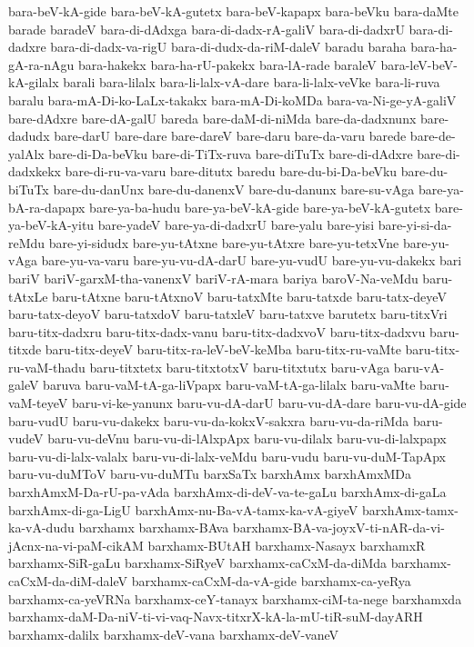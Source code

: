 {bara-beV-kA-gide
bara-beV-kA-gutetx
bara-beV-kapapx
bara-beVku
bara-daMte
barade
baradeV
bara-di-dAdxga
bara-di-dadx-rA-galiV
bara-di-dadxrU
bara-di-dadxre
bara-di-dadx-va-rigU
bara-di-dudx-da-riM-daleV
baradu
baraha
bara-ha-gA-ra-nAgu
bara-hakekx
bara-ha-rU-pakekx
bara-lA-rade
baraleV
bara-leV-beV-kA-gilalx
barali
bara-lilalx
bara-li-lalx-vA-dare
bara-li-lalx-veVke
bara-li-ruva
baralu
bara-mA-Di-ko-LaLx-takakx
bara-mA-Di-koMDa
bara-va-Ni-ge-yA-galiV
bare-dAdxre
bare-dA-galU
bareda
bare-daM-di-niMda
bare-da-dadxnunx
bare-dadudx
bare-darU
bare-dare
bare-dareV
bare-daru
bare-da-varu
barede
bare-de-yalAlx
bare-di-Da-beVku
bare-di-TiTx-ruva
bare-diTuTx
bare-di-dAdxre
bare-di-dadxkekx
bare-di-ru-va-varu
bare-ditutx
baredu
bare-du-bi-Da-beVku
bare-du-biTuTx
bare-du-danUnx
bare-du-danenxV
bare-du-danunx
bare-su-vAga
bare-ya-bA-ra-dapapx
bare-ya-ba-hudu
bare-ya-beV-kA-gide
bare-ya-beV-kA-gutetx
bare-ya-beV-kA-yitu
bare-yadeV
bare-ya-di-dadxrU
bare-yalu
bare-yisi
bare-yi-si-da-reMdu
bare-yi-sidudx
bare-yu-tAtxne
bare-yu-tAtxre
bare-yu-tetxVne
bare-yu-vAga
bare-yu-va-varu
bare-yu-vu-dA-darU
bare-yu-vudU
bare-yu-vu-dakekx
bari
bariV
bariV-garxM-tha-vanenxV
bariV-rA-mara
bariya
baroV-Na-veMdu
baru-tAtxLe
baru-tAtxne
baru-tAtxnoV
baru-tatxMte
baru-tatxde
baru-tatx-deyeV
baru-tatx-deyoV
baru-tatxdoV
baru-tatxleV
baru-tatxve
barutetx
baru-titxVri
baru-titx-dadxru
baru-titx-dadx-vanu
baru-titx-dadxvoV
baru-titx-dadxvu
baru-titxde
baru-titx-deyeV
baru-titx-ra-leV-beV-keMba
baru-titx-ru-vaMte
baru-titx-ru-vaM-thadu
baru-titxtetx
baru-titxtotxV
baru-titxtutx
baru-vAga
baru-vA-galeV
baruva
baru-vaM-tA-ga-liVpapx
baru-vaM-tA-ga-lilalx
baru-vaMte
baru-vaM-teyeV
baru-vi-ke-yanunx
baru-vu-dA-darU
baru-vu-dA-dare
baru-vu-dA-gide
baru-vudU
baru-vu-dakekx
baru-vu-da-kokxV-sakxra
baru-vu-da-riMda
baru-vudeV
baru-vu-deVnu
baru-vu-di-lAlxpApx
baru-vu-dilalx
baru-vu-di-lalxpapx
baru-vu-di-lalx-valalx
baru-vu-di-lalx-veMdu
baru-vudu
baru-vu-duM-TapApx
baru-vu-duMToV
baru-vu-duMTu
barxSaTx
barxhAmx
barxhAmxMDa
barxhAmxM-Da-rU-pa-vAda
barxhAmx-di-deV-va-te-gaLu
barxhAmx-di-gaLa
barxhAmx-di-ga-LigU
barxhAmx-nu-Ba-vA-tamx-ka-vA-giyeV
barxhAmx-tamx-ka-vA-dudu
barxhamx
barxhamx-BAva
barxhamx-BA-va-joyxV-ti-nAR-da-vi-jAcnx-na-vi-paM-cikAM
barxhamx-BUtAH
barxhamx-Nasayx
barxhamxR
barxhamx-SiR-gaLu
barxhamx-SiRyeV
barxhamx-caCxM-da-diMda
barxhamx-caCxM-da-diM-daleV
barxhamx-caCxM-da-vA-gide
barxhamx-ca-yeRya
barxhamx-ca-yeVRNa
barxhamx-ceY-tanayx
barxhamx-ciM-ta-nege
barxhamxda
barxhamx-daM-Da-niV-ti-vi-vaq-Navx-titxrX-kA-la-mU-tiR-suM-dayARH
barxhamx-dalilx
barxhamx-deV-vana
barxhamx-deV-vaneV
}
